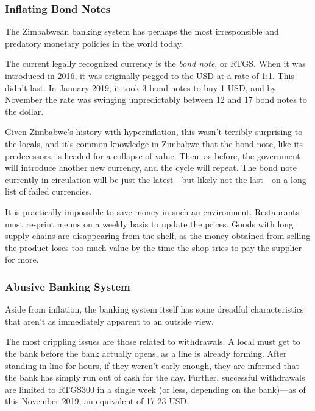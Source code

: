 \documentclass{article}
\begin{document}
\subsubsection{Inflating Bond Notes} \label{inflation}

The Zimbabwean banking system has perhaps the most irresponsible and predatory monetary policies in the world today.

The current legally recognized currency is the \textit{bond note}, or RTGS. When it was introduced in 2016, it was originally pegged to the USD at a rate of 1:1. This didn't last. In January 2019, it took 3 bond notes to buy 1 USD, and by November the rate was swinging unpredictably between 12 and 17 bond notes to the dollar.

Given Zimbabwe's \href{https://en.wikipedia.org/wiki/Hyperinflation_in_Zimbabwe}{history with hyperinflation}, this wasn't terribly surprising to the locals, and it's common knowledge in Zimbabwe that the bond note, like its predecessors, is headed for a collapse of value. Then, as before, the government will introduce another new currency, and the cycle will repeat. The bond note currently in circulation will be just the latest---but likely not the last---on a long list of failed currencies.

It is practically impossible to save money in such an environment. Restaurants must re-print menus on a weekly basis to update the prices. Goods with long supply chains are disappearing from the shelf, as the money obtained from selling the product loses too much value by the time the shop tries to pay the supplier for more.

\subsubsection{Abusive Banking System} \label{banking}

Aside from inflation, the banking system itself has some dreadful characteristics that aren't as immediately apparent to an outside view.

The most crippling issues are those related to withdrawals. A local must get to the bank before the bank actually opens, as a line is already forming. After standing in line for hours, if they weren't early enough, they are informed that the bank has simply run out of cash for the day. Further, successful withdrawals are limited to RTGS300 in a single week (or less, depending on the bank)---as of this November 2019, an equivalent of 17-23 USD.
\end{document}
